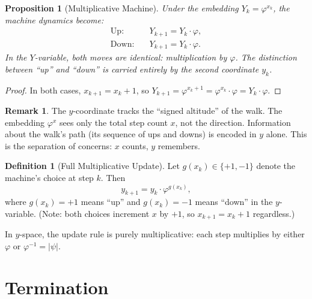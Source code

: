 \documentclass[11pt,a4paper]{article}
\theoremstyle{plain}
\newtheorem{proposition}[theorem]{Proposition}
\theoremstyle{definition}
\newtheorem{definition}[theorem]{Definition}
\newtheorem{remark}[theorem]{Remark}
\newcommand{\vp}{\varphi}
\newcommand{\ps}{\psi}
\begin{document}
\begin{proposition}[Multiplicative Machine]\label{prop:mult-machine}
Under the embedding $Y_{k} = \vp^{x_{k}}$, the machine dynamics become:
\begin{align}
  \text{Up:} &\quad Y_{k+1} = Y_{k} \cdot \vp, \label{eq:up-mult}\\
  \text{Down:} &\quad Y_{k+1} = Y_{k} \cdot \vp. \label{eq:down-mult}
\end{align}
In the $Y$-variable, both moves are identical: multiplication by $\vp$.
The distinction between ``up'' and ``down'' is carried entirely by the
second coordinate $y_{k}$.
\end{proposition}

\begin{proof}
In both cases, $x_{k+1} = x_{k} + 1$, so
$Y_{k+1} = \vp^{x_{k}+1} = \vp^{x_{k}} \cdot \vp = Y_{k} \cdot \vp$.
\end{proof}

\begin{remark}\label{rem:y-tracking}
The $y$-coordinate tracks the ``signed altitude'' of the walk.  The
embedding $\vp^{x}$ sees only the total step count $x$, not the
direction.  Information about the walk's path (its sequence of ups and
downs) is encoded in $y$ alone.  This is the separation of concerns:
$x$ counts, $y$ remembers.
\end{remark}

\begin{definition}[Full Multiplicative Update]\label{def:full-update}
Let $g(x_{k}) \in \{+1, -1\}$ denote the machine's choice at step $k$.
Then
\begin{equation}\label{eq:full-update}
  y_{k+1} = y_{k} \cdot \vp^{g(x_{k})},
\end{equation}
where $g(x_{k}) = +1$ means ``up'' and $g(x_{k}) = -1$ means ``down''
in the $y$-variable.  (Note: both choices increment $x$ by $+1$, so
$x_{k+1} = x_{k} + 1$ regardless.)

In $y$-space, the update rule is purely multiplicative:
each step multiplies by either $\vp$ or $\vp^{-1} = |\ps|$.
\end{definition}

\section{Termination}\label{sec:termination}
\end{document}
